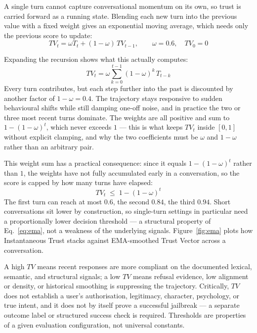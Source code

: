 \documentclass[conference]{IEEEtran}
\begin{document}
A single turn cannot capture conversational momentum on its own, so trust is carried forward as a running state. Blending each new turn into the previous value with a fixed weight gives an exponential moving average, which needs only the previous score to update:
\begin{equation}
TV_t = \omega T_t + (1-\omega)\,TV_{t-1}, \qquad \omega = 0.6, \quad TV_0 = 0
\label{eq:ema}
\end{equation}

Expanding the recursion shows what this actually computes:
\begin{equation}
TV_t = \omega \sum_{k=0}^{t-1} (1-\omega)^k \, T_{t-k}
\label{eq:unroll}
\end{equation}
Every turn contributes, but each step further into the past is discounted by another factor of $1-\omega=0.4$. The trajectory stays responsive to sudden behavioural shifts while still damping one-off noise, and in practice the two or three most recent turns dominate. The weights are all positive and sum to $1-(1-\omega)^t$, which never exceeds $1$ — this is what keeps $TV_t$ inside $[0,1]$ without explicit clamping, and why the two coefficients must be $\omega$ and $1-\omega$ rather than an arbitrary pair.

This weight sum has a practical consequence: since it equals $1-(1-\omega)^t$ rather than $1$, the weights have not fully accumulated early in a conversation, so the score is capped by how many turns have elapsed:
\begin{equation}
TV_t \;\le\; 1 - (1-\omega)^t
\label{eq:ceiling}
\end{equation}
The first turn can reach at most $0.6$, the second $0.84$, the third $0.94$. Short conversations sit lower by construction, so single-turn settings in particular need a proportionally lower decision threshold — a structural property of Eq.~\ref{eq:ema}, not a weakness of the underlying signals. 
Figure~\ref{fig:ema} plots how Instantaneous Trust stacks against EMA-smoothed Trust Vector across a conversation. 

A high $TV$ means recent responses are more compliant on the documented lexical, semantic, and structural signals; a low $TV$ means refusal evidence, low alignment or density, or historical smoothing is suppressing the trajectory. Critically, $TV$ does not establish a user's authorisation, legitimacy, character, psychology, or true intent, and it does not by itself prove a successful jailbreak — a separate outcome label or structured success check is required. Thresholds are properties of a given evaluation configuration, not universal constants.
\end{document}
